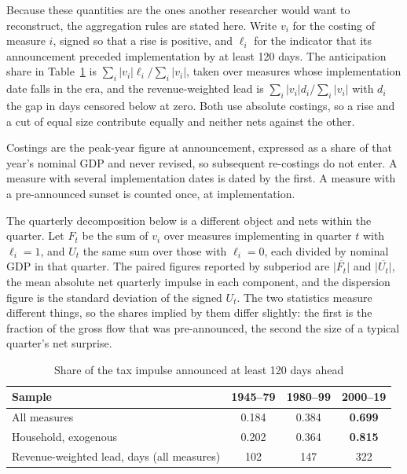 \documentclass[11pt,a4paper]{article}
\begin{document}
Because these quantities are the ones another researcher would want to reconstruct, the aggregation
rules are stated here. Write $v_i$ for the costing of
measure $i$, signed so that a rise is positive, and $\ell_i$ for the indicator that its announcement
preceded implementation by at least 120 days. The anticipation share in Table~\ref{tab:antic} is
$\sum_i |v_i| \ell_i / \sum_i |v_i|$, taken over measures whose implementation date falls in the era,
and the revenue-weighted lead is $\sum_i |v_i| d_i / \sum_i |v_i|$ with $d_i$ the gap in days
censored below at zero. Both use absolute costings, so a rise and a cut of equal size contribute
equally and neither nets against the other.

Costings are the peak-year figure at announcement, expressed as a share of that year's nominal GDP
and never revised, so subsequent re-costings do not enter. A measure with several implementation
dates is dated by the first. A measure with a pre-announced sunset is counted once, at
implementation.

The quarterly decomposition below is a different object and nets within the quarter. Let $F_t$ be the
sum of $v_i$ over measures implementing in quarter $t$ with $\ell_i = 1$, and $U_t$ the same sum over
those with $\ell_i = 0$, each divided by nominal GDP in that quarter. The paired figures reported by
subperiod are $\overline{|F_t|}$ and $\overline{|U_t|}$, the mean absolute net quarterly impulse in
each component, and the dispersion figure is the standard deviation of the signed $U_t$. The two statistics measure different things, so the shares implied by them differ slightly: the first is the fraction of the gross flow that was pre-announced, the second the size of a typical quarter's net surprise.

\begin{table}[htbp]
\centering
\caption{Share of the tax impulse announced at least 120 days ahead}
\label{tab:antic}
\begin{tabular}{lccc}
\toprule
Sample & 1945--79 & 1980--99 & 2000--19 \\
\midrule
All measures & 0.184 & 0.384 & \textbf{0.699} \\
Household, exogenous & 0.202 & 0.364 & \textbf{0.815} \\
\midrule
Revenue-weighted lead, days (all measures) & 102 & 147 & 322 \\
\bottomrule
\end{tabular}
\end{table}
\end{document}
